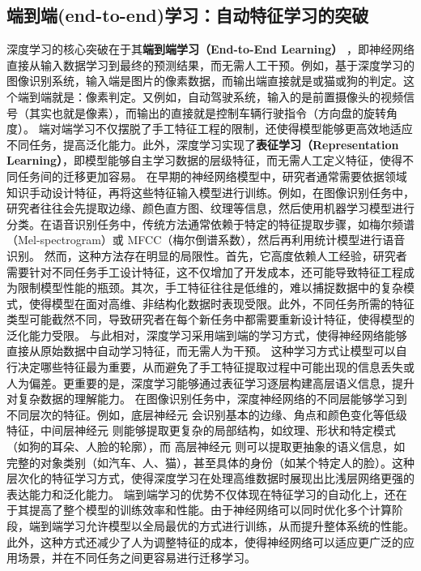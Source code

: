 \subsection{端到端(end-to-end)学习：自动特征学习的突破}



深度学习的核心突破在于其{\bf 端到端学习（End-to-End Learning）} ，即神经网络直接从输入数据学习到最终的预测结果，而无需人工干预。例如，基于深度学习的图像识别系统，输入端是图片的像素数据，而输出端直接就是或猫或狗的判定。这个端到端就是：像素判定。又例如，自动驾驶系统，输入的是前置摄像头的视频信号（其实也就是像素），而输出的直接就是控制车辆行驶指令（方向盘的旋转角度）。
端对端学习不仅摆脱了手工特征工程的限制，还使得模型能够更高效地适应不同任务，提高泛化能力。此外，深度学习实现了{\bf 表征学习（Representation Learning）}，即模型能够自主学习数据的层级特征，而无需人工定义特征，使得不同任务间的迁移更加容易。
在早期的神经网络模型中，研究者通常需要依据领域知识手动设计特征，再将这些特征输入模型进行训练。例如，在图像识别任务中，研究者往往会先提取边缘、颜色直方图、纹理等信息，然后使用机器学习模型进行分类。在语音识别任务中，传统方法通常依赖于特定的特征提取步骤，如梅尔频谱（Mel-spectrogram）或 MFCC（梅尔倒谱系数），然后再利用统计模型进行语音识别。
然而，这种方法存在明显的局限性。首先，它高度依赖人工经验，研究者需要针对不同任务手工设计特征，这不仅增加了开发成本，还可能导致特征工程成为限制模型性能的瓶颈。其次，手工特征往往是低维的，难以捕捉数据中的复杂模式，使得模型在面对高维、非结构化数据时表现受限。此外，不同任务所需的特征类型可能截然不同，导致研究者在每个新任务中都需要重新设计特征，使得模型的泛化能力受限。
与此相对，深度学习采用端到端的学习方式，使得神经网络能够直接从原始数据中自动学习特征，而无需人为干预。 这种学习方式让模型可以自行决定哪些特征最为重要，从而避免了手工特征提取过程中可能出现的信息丢失或人为偏差。更重要的是，深度学习能够通过表征学习逐层构建高层语义信息，提升对复杂数据的理解能力。
在图像识别任务中，深度神经网络的不同层能够学习到不同层次的特征。例如，底层神经元 会识别基本的边缘、角点和颜色变化等低级特征，中间层神经元 则能够提取更复杂的局部结构，如纹理、形状和特定模式（如狗的耳朵、人脸的轮廓），而 高层神经元 则可以提取更抽象的语义信息，如完整的对象类别（如汽车、人、猫），甚至具体的身份（如某个特定人的脸）。这种层次化的特征学习方式，使得深度学习在处理高维数据时展现出比浅层网络更强的表达能力和泛化能力。
端到端学习的优势不仅体现在特征学习的自动化上，还在于其提高了整个模型的训练效率和性能。由于神经网络可以同时优化多个计算阶段，端到端学习允许模型以全局最优的方式进行训练，从而提升整体系统的性能。此外，这种方式还减少了人为调整特征的成本，使得神经网络可以适应更广泛的应用场景，并在不同任务之间更容易进行迁移学习。
